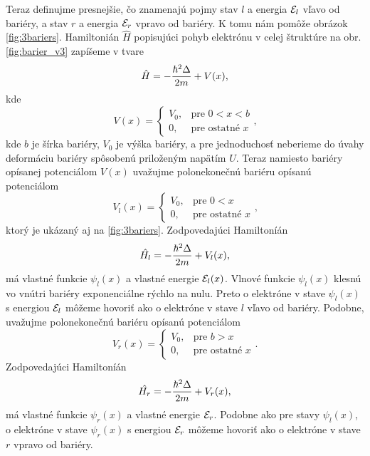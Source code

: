 Teraz definujme presnejšie, čo znamenajú pojmy stav $l$ a energia $\mathcal{E}_{l}$ vľavo od bariéry, a stav $r$ a energia $\mathcal{E}_{r}$ vpravo od bariéry.
K tomu nám pomôže obrázok \eqref{fig:3bariers}.
Hamiltonián $\hat{H}$ popisujúci pohyb elektrónu v celej štruktúre na obr. \eqref{fig:barier_v3} zapíšeme v tvare
\begin{equation}
 \hat{H}=-\frac{\hbar^2 \Delta }{2m}+V(x) \text{,}
\end{equation}
kde
\begin{equation}
 \label{eq:02potential_barrier}
 V(x)=
 \begin{cases}
    V_0,& \text{pre } 0<x<b\\
    0,              & \text{pre ostatné $x$}
\end{cases}\text{,}
\end{equation}
kde $b$ je šírka bariéry, $V_0$ je výška bariéry, a pre jednoduchosť neberieme do úvahy deformáciu bariéry spôsobenú priloženým napätím $U$.
Teraz namiesto bariéry opísanej potenciálom $V(x)$ uvažujme polonekonečnú bariéru opísanú potenciálom
\begin{equation}
 \label{eq:02potential_left}
 V_l(x)=
 \begin{cases}
    V_0,& \text{pre } 0<x\\
    0,              & \text{pre ostatné $x$}
\end{cases}\text{,}
\end{equation}
ktorý je ukázaný aj na \eqref{fig:3bariers}. Zodpovedajúci Hamiltoníán
\begin{equation}
 \hat{H_l}=-\frac{\hbar^2 \Delta }{2m}+V_l(x) \text{,}
\end{equation}
má vlastné funkcie $\psi_{l}(x)$ a vlastné energie $\mathcal{E}_{l}(x)$. Vlnové funkcie
$\psi_{l}(x)$ klesnú vo vnútri bariéry exponenciálne rýchlo na nulu. Preto o elektróne v stave
$\psi_{l}(x)$ s energiou $\mathcal{E}_{l}$ môžeme hovoriť ako o elektróne v stave $l$ vľavo od bariéry.
Podobne, uvažujme polonekonečnú bariéru opísanú potenciálom
 \begin{equation}
 \label{eq:02potential_right}
 V_r(x)=
 \begin{cases}
    V_0,& \text{pre } b>x\\
    0,              & \text{pre ostatné $x$}
\end{cases}\text{.}
\end{equation}
 Zodpovedajúci Hamiltoníán
\begin{equation}
 \hat{H_r}=-\frac{\hbar^2 \Delta }{2m}+V_r(x) \text{,}
\end{equation}
má vlastné funkcie $\psi_{r}(x)$ a vlastné energie $\mathcal{E}_{r}$. Podobne ako pre stavy $\psi_{l}(x)$,
o elektróne v stave
$\psi_{r}(x)$ s energiou $\mathcal{E}_{r}$ môžeme hovoriť ako o elektróne v stave $r$ vpravo od bariéry.

